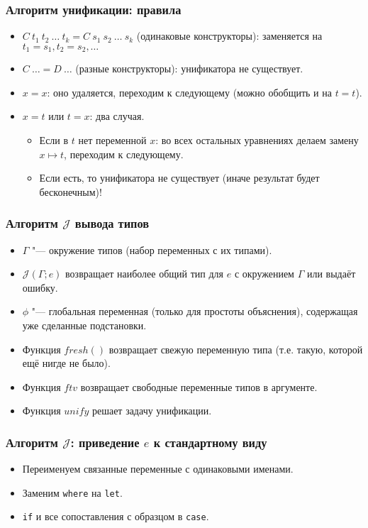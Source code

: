 \documentclass[11pt]{beamer}
\begin{document}
\begin{frame}[fragile]
\frametitle{Алгоритм унификации: правила}
\begin{itemize}
    \item $C~t_1~t_2~\ldots~t_k = C~s_1~s_2~\ldots~s_k$ (одинаковые конструкторы): \pause заменяется на $t_1 = s_1, t_2 = s_2, \ldots$
    \pause
    \item $C~\ldots = D~\ldots$ (разные конструкторы): \pause унификатора не существует.
    \pause
    \item $x=x$: \pause оно удаляется, переходим к следующему (можно обобщить и на $t=t$).
    \pause
    \item $x=t$ или $t=x$: два случая. \pause
    \begin{itemize}
        \item Если в $t$ нет переменной $x$: \pause во всех остальных уравнениях делаем замену $x \mapsto t$, переходим к следующему.
        \item Если есть\pause, то унификатора не существует (иначе результат будет бесконечным)!
    \end{itemize}
\end{itemize}
\end{frame}

\newcommand{\fresh}{\mathord{\mathit{fresh}}()}
\newcommand{\J}{\mathcal{J}}
\begin{frame}[fragile]
\frametitle{Алгоритм $\J$ вывода типов}
\begin{itemize}
    \item $\Gamma$ "--- окружение типов (набор переменных с их типами).
    \item $\J(\Gamma; e)$ возвращает наиболее общий тип для $e$ с окружением $\Gamma$ или выдаёт ошибку.
    \pause
    \vspace{1em}
    \item $\phi$ "--- глобальная переменная (только для простоты объяснения), содержащая уже сделанные подстановки.
    \item Функция $\fresh$ возвращает свежую переменную типа (т.е. такую, которой ещё нигде не было).
    \item Функция $ftv$ возвращает свободные переменные типов в аргументе.
    \item Функция $unify$ решает задачу унификации.
\end{itemize}
\end{frame}

\begin{frame}[fragile]
\frametitle{Алгоритм $\J$: приведение $e$ к стандартному виду}
\begin{itemize}
    \item Переименуем связанные переменные с одинаковыми именами.
    \item Заменим \lstinline|where| на \lstinline|let|.
    \item \lstinline|if| и все сопоставления с образцом в \lstinline|case|.
\end{itemize}
\end{frame}
\end{document}
